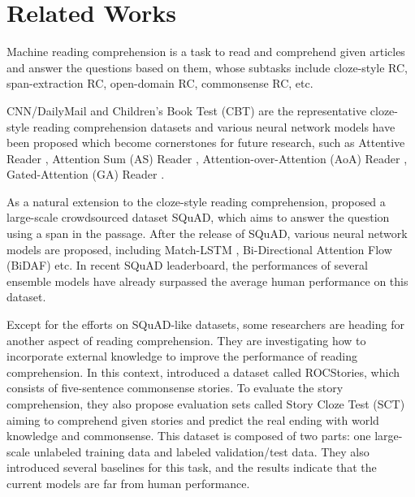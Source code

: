 \documentclass[letterpaper]{article} %
\begin{document}
\section{Related Works}\label{related-works}
Machine reading comprehension is a task to read and comprehend given articles and answer the questions based on them, whose subtasks include cloze-style RC, span-extraction RC, open-domain RC, commonsense RC, etc.

CNN/DailyMail \cite{hermann-etal-2015} and Children's Book Test (CBT) \cite{hill-etal-2015} are the representative cloze-style reading comprehension datasets and various neural network models have been proposed which become cornerstones for future research, such as Attentive Reader \cite{hermann-etal-2015}, Attention Sum (AS) Reader \cite{kadlec-etal-2016}, Attention-over-Attention (AoA) Reader \cite{cui-acl2017-aoa}, Gated-Attention (GA) Reader \cite{dhingra-etal-2017}.

As a natural extension to the cloze-style reading comprehension, \citeauthor{rajpurkar-etal-2016}  proposed a large-scale crowdsourced dataset SQuAD, which aims to answer the question using a span in the passage. After the release of SQuAD, various neural network models are proposed, including Match-LSTM \cite{wang-and-jiang-2016}, Bi-Directional Attention Flow (BiDAF) \cite{seo-etal-2016} etc. In recent SQuAD leaderboard, the performances of several ensemble models have already surpassed the average human performance on this dataset.

Except for the efforts on SQuAD-like datasets, some researchers are heading for another aspect of reading comprehension.
They are investigating how to incorporate external knowledge to improve the performance of reading comprehension.
In this context, \citeauthor{mostafazadeh-etal-2016}  introduced a dataset called ROCStories, which consists of five-sentence commonsense stories. To evaluate the story comprehension, they also propose evaluation sets called Story Cloze Test (SCT) aiming to comprehend given stories and predict the real ending with world knowledge and commonsense.
This dataset is composed of two parts: one large-scale unlabeled training data and labeled validation/test data.
They also introduced several baselines for this task, and the results indicate that the current models are far from human performance.
\end{document}
